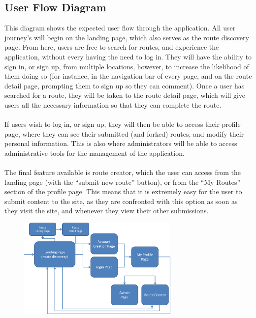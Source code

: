 \subsection{User Flow Diagram}
 This diagram shows the expected user flow through the application. All user journey's will begin on the landing page, which also serves as the route discovery page. From here, users are free to search for routes, and experience the application, without every having the need to log in. They will have the ability to sign in, or sign up, from multiple locations, however, to increase the likelihood of them doing so (for instance, in the navigation bar of every page, and on the route detail page, prompting them to sign up so they can comment). Once a user has searched for a route, they will be taken to the route detail page, which will give users all the necessary information so that they can complete the route.\ \\
 \ \\
 If users wish to log in, or sign up, they will then be able to access their profile page, where they can see their submitted (and forked) routes, and modify their personal information. This is also where administrators will be able to access administrative tools for the management of the application. \ \\
 \ \\
The final feature available is route creator, which the user can access from the landing page (with the ``submit new route'' button), or from the ``My Routes'' section of the profile page. This means that it is extremely easy for the user to submit content to the site, as they are confronted with this option as soon as they visit the site, and whenever they view their other submissions.
 
 \begin{figure}[!ht]
 \begin{center}
 \includegraphics[width=0.7\textwidth]{images/flow.png}
 \end{center}
 \vspace{-6mm}
 \end{figure}
